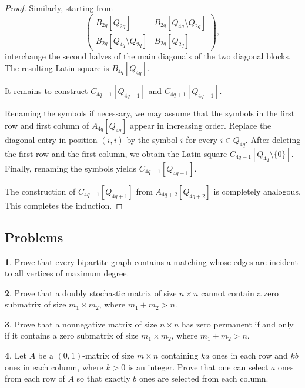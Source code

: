 \documentclass[11pt]{article}
\theoremstyle{definition}
\newtheorem{exercise}{\quad}
\begin{document}
{{{\begin{proof}
Similarly, starting from
\[
\left(
\begin{array}{cc}
B_{2q}[Q_{2q}]&
B_{2q}[Q_{4q}\setminus Q_{2q}]\\
B_{2q}[Q_{4q}\setminus Q_{2q}]&
B_{2q}[Q_{2q}]
\end{array}
\right),
\]
interchange the second halves of the main diagonals of the two diagonal
blocks.
The resulting Latin square is
$B_{4q}[Q_{4q}]$.

It remains to construct
$C_{4q-1}[Q_{4q-1}]$
and
$C_{4q+1}[Q_{4q+1}]$.

Renaming the symbols if necessary, we may assume that the symbols in
the first row and first column of
$A_{4q}[Q_{4q}]$
appear in increasing order.
Replace the diagonal entry in position $(i,i)$ by the symbol $i$ for
every
$i\in Q_{4q}$.
After deleting the first row and the first column, we obtain the Latin
square
$C_{4q-1}[Q_{4q}\setminus\{0\}]$.
Finally, renaming the symbols yields
$C_{4q-1}[Q_{4q-1}]$.

The construction of
$C_{4q+1}[Q_{4q+1}]$
from
$A_{4q+2}[Q_{4q+2}]$
is completely analogous.
This completes the induction.
\end{proof}





\subsection{Problems}

\begin{exercise}
Prove that every bipartite graph contains a matching whose edges are
incident to all vertices of maximum degree.
\end{exercise}

\begin{exercise}
Prove that a doubly stochastic matrix of size $n\times n$ cannot
contain a zero submatrix of size $m_1\times m_2$, where
$m_1+m_2>n$.
\end{exercise}

\begin{exercise}
Prove that a nonnegative matrix of size $n\times n$ has zero permanent
if and only if it contains a zero submatrix of size
$m_1\times m_2$, where $m_1+m_2>n$.
\end{exercise}

\begin{exercise}\cite{Lovasz}
Let $A$ be a $(0,1)$-matrix of size $m\times n$ containing $ka$ ones
in each row and $kb$ ones in each column, where $k>0$ is an integer.
Prove that one can select $a$ ones from each row of $A$ so that exactly
$b$ ones are selected from each column.
\end{exercise}

}}}
\end{document}
